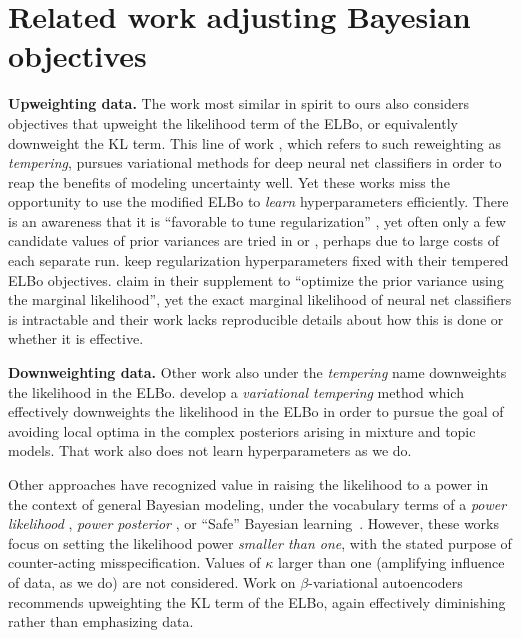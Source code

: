 \section{Related work adjusting Bayesian objectives}
\label{sec:related_work}

\textbf{Upweighting data.}
The work most similar in spirit to ours also considers objectives that upweight the likelihood term of the ELBo, or equivalently downweight the KL term.
This line of work \citep{pitas2024fine,aitchison2021statistical,osawa2019practical,zhang2018noisy}, which refers to such reweighting as \emph{tempering}, pursues variational methods for deep neural net classifiers in order to reap the benefits of modeling uncertainty well.  Yet these works miss the opportunity to use the modified ELBo to \emph{learn} hyperparameters efficiently. There is an awareness that it is ``favorable to tune regularization'' \citep{zhang2018noisy}, yet often only a few candidate values of prior variances are tried in \citet[Fig. 8]{osawa2019practical} or \citet{zhang2018noisy}, perhaps due to large costs of each separate run.
\citet{aitchison2021statistical} keep regularization hyperparameters fixed with their tempered ELBo objectives. \citet{pitas2024fine} claim in their supplement to ``optimize the prior variance using the marginal
likelihood'', yet the exact marginal likelihood of neural net classifiers is intractable and their work lacks reproducible details about how this is done or whether it is effective.

\textbf{Downweighting data.}
Other work also under the \emph{tempering} name downweights the likelihood in the ELBo.
\citet{mandt2016variational} develop a \emph{variational tempering} method which effectively downweights the likelihood in the ELBo in order to pursue the goal of avoiding local optima in the complex posteriors arising in mixture and topic models. That work also does not learn hyperparameters as we do.

Other approaches have recognized value in raising the likelihood to a power in the context of general Bayesian modeling, under the vocabulary terms of a \emph{power likelihood} \citep{antoniano2013bayesian}, \emph{power posterior} \citep{friel2008marginal,miller2019robust}, or ``Safe'' Bayesian learning~\citep{grunwald2012safe,grunwald2017inconsistency}. 
However, these works focus on setting the likelihood power \emph{smaller than one}, with the stated purpose of counter-acting misspecification. Values of $\kappa$ larger than one (amplifying influence of data, as we do) are not considered. Work on $\beta$-variational autoencoders~\citep{higginsBetaVAE2017} recommends upweighting the KL term of the ELBo, again effectively diminishing rather than emphasizing data.

